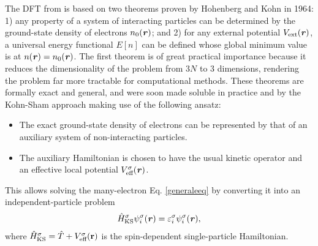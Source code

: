 The DFT from is based on two theorems proven by Hohenberg and Kohn
\cite{Hohenberg1964} in 1964: 1) any property of a system of interacting particles
can be determined by the ground-state density of electrons $n_0(\textbf{\textit r})$;
and 2) for any external potential $V_\text{ext}(\textbf{\textit r})$, a universal
energy functional $E[n]$ can be defined whose global minimum value is at
$n(\textbf{\textit r})=n_0(\textbf{\textit r})$. The first theorem is of great
practical importance because it reduces the dimensionality of the problem from $3N$
to 3 dimensions, rendering the problem far more tractable for computational methods.
These theorems are formally exact and general, and were soon made soluble in practice
and by the Kohn-Sham approach \cite{Kohn1965} making use of the following ansatz:
%
\begin{itemize}
\item The exact ground-state density of electrons can be represented by that of an auxiliary system of non-interacting particles.
\item The auxiliary Hamiltonian is chosen to have the usual kinetic operator and an effective local potential $V_\text{eff}^\sigma(\textbf{\textit r})$.
\end{itemize}
This allows solving the many-electron Eq. \ref{generaleeq} by converting it into an independent-particle problem 
\begin{equation}\label{kseq}
\begin{aligned}
\hat{H}_\text{KS}^\sigma\psi_i^\sigma(\textbf{\textit r})=\varepsilon_i^\sigma\psi_i^\sigma(\textbf{\textit r}), 
\end{aligned}
\end{equation}
where $\hat{H}_\text{KS}^\sigma=\hat{T}+V_\text{eff}^\sigma(\textbf r)$ is the spin-dependent single-particle Hamiltonian.

